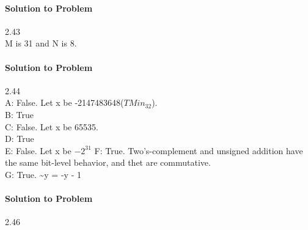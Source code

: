 \documentclass{report}
\begin{document}
\paragraph{Solution to Problem} 2.43 \\
M is 31 and N is 8.

\paragraph{Solution to Problem} 2.44 \\
A: False. Let x be -2147483648($TMin_32$). \\
B: True \\
C: False. Let x be 65535. \\
D: True \\
E: False. Let x be $-2^{31}$
F: True. Two's-complement and unsigned addition have the same bit-level behavior, and thet are commutative. \\
G: True. \textasciitilde y = -y - 1

\paragraph{Solution to Problem} 2.46 \\
\end{document}
